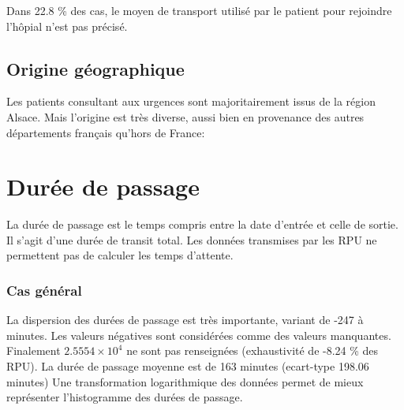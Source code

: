 \documentclass[12pt,english,french,twoside]{report}\usepackage[]{graphicx}\usepackage[]{color}
\begin{document}
Dans 22.8 \% des cas, le moyen de transport utilisé par le patient pour rejoindre l'hôpial n'est pas précisé.

\section*{Origine géographique}



Les patients consultant aux urgences sont majoritairement issus de la région Alsace. Mais l'origine est très diverse, aussi bien en provenance des autres départements français qu'hors de France:



\newpage
\chapter{Durée de passage}


La durée de passage est le temps compris entre la date d'entrée et celle de sortie. Il s'agit d'une durée de transit total. Les données transmises par les RPU ne permettent pas de calculer les temps d'attente.

\subsection{Cas général}




La dispersion des durées de passage est très importante, variant de -247 à  minutes. Les valeurs négatives sont considérées comme des valeurs manquantes. 
Finalement \ensuremath{2.5554\times 10^{4}} ne sont pas renseignées (exhaustivité de -8.24 \% des RPU). 
La durée de passage moyenne est de 163 minutes (ecart-type 198.06 minutes)
Une transformation logarithmique des données permet de mieux représenter l'histogramme des durées de passage. 
\end{document}

